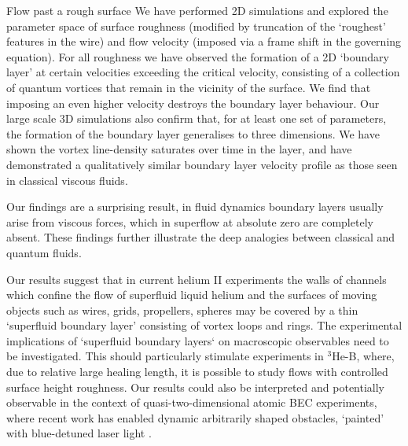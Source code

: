 \begin{chapter}{\label{cha:afm}Flow past a rough surface}
We have performed 2D simulations and explored the parameter space of surface roughness (modified by truncation of the `roughest' features in the wire) and flow velocity (imposed via a frame shift in the governing equation). For all roughness we have observed the formation of a 2D `boundary layer' at certain velocities exceeding the critical velocity, consisting of a collection of quantum vortices that remain in the vicinity of the surface. We find that imposing an even higher velocity destroys the boundary layer behaviour. Our large scale 3D simulations also confirm that, for at least one set of parameters, the formation of the boundary layer generalises to three dimensions. We have shown the vortex line-density saturates over time in the layer, and have demonstrated a qualitatively similar boundary layer velocity profile as those seen in classical viscous fluids.

Our findings are a surprising result, in fluid dynamics boundary layers usually arise from viscous forces, which in superflow at absolute zero are completely absent.  These findings further illustrate the deep analogies between classical and quantum fluids.

Our results suggest that in current helium II experiments the walls of channels which confine the flow of superfluid liquid helium and the surfaces of moving objects such as wires, grids, propellers, spheres may be covered by a thin `superfluid boundary layer' consisting of vortex loops and rings. The experimental implications of `superfluid boundary layers` on macroscopic
observables need to be investigated.  This should particularly stimulate experiments in $^3$He-B, where, due to relative large healing length, it is possible to study flows with controlled surface height roughness. Our results could also be interpreted and potentially observable in the context of quasi-two-dimensional atomic BEC experiments, where recent work has enabled dynamic arbitrarily shaped obstacles, `painted' with blue-detuned laser light \cite{Henderson09}.
\end{chapter}



